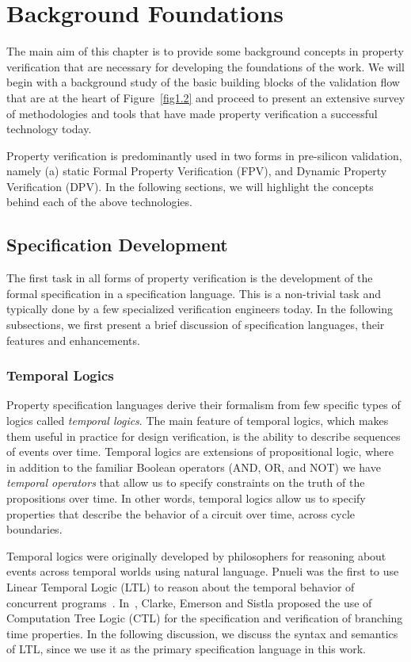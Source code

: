 \chapter{Background Foundations} \label{chap2}
The main aim of this chapter is to provide some background concepts 
in property verification that are necessary for developing the foundations of 
the work. We will begin with a background study of the basic building blocks  
of the validation flow that are at the heart of Figure~\ref{fig1.2}
and proceed to present an extensive survey of 
methodologies and tools that have made property verification a successful 
technology today.

\noindent
Property verification is predominantly used in two forms in pre-silicon
validation, namely (a) static Formal Property Verification (FPV), and 
Dynamic Property Verification (DPV). In the following sections, 
we will highlight the concepts behind each of the above technologies. 

\section{Specification Development} \label{sec2.1}
The first task in all forms of property verification is the development of
the formal specification in a specification language.
This is a non-trivial task and typically done by a few specialized 
verification engineers today. In the following subsections, we first 
present a brief discussion of specification languages, their features and 
enhancements.

\subsection{Temporal Logics} \label{sec2.1.0}
\noindent
Property specification languages derive their formalism from few specific
types of logics called {\em temporal logics}.  The main feature of temporal 
logics, which makes them useful in practice for design verification, is the 
ability to describe sequences of events over time. Temporal logics are 
extensions
of propositional logic, where in addition to the familiar Boolean operators
(AND, OR, and NOT) we have {\em temporal operators} that allow us to specify
constraints on the truth of the propositions over time. In other words,
temporal logics allow us to specify properties that describe the behavior of
a circuit over time, across cycle boundaries. 

\noindent
Temporal logics were originally developed by philosophers for reasoning 
about events across temporal worlds
using natural language. Pnueli was the first to use Linear Temporal Logic
(LTL) to reason about the temporal behavior of concurrent
programs~\cite{pnueli:77}. In~\cite{clarke:86}, Clarke, Emerson and Sistla 
proposed the use of Computation Tree Logic (CTL) for the specification and 
verification of branching time properties. In the following discussion, 
we discuss the syntax and semantics of LTL, since we use it as the primary 
specification language in this work.

